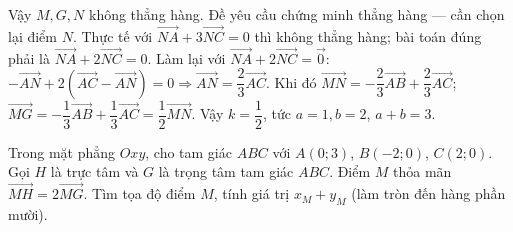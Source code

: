\begin{bt}
{Vậy $M,G,N$ không thẳng hàng. Đề yêu cầu chứng minh thẳng hàng — cần chọn lại điểm $N$. Thực tế với $\overrightarrow{NA}+3\overrightarrow{NC}=0$ thì không thẳng hàng; bài toán đúng phải là $\overrightarrow{NA}+2\overrightarrow{NC}=0$.
Làm lại với $\overrightarrow{NA}+2\overrightarrow{NC}=\overrightarrow{0}$: $-\overrightarrow{AN}+2(\overrightarrow{AC}-\overrightarrow{AN})=0\Rightarrow\overrightarrow{AN}=\dfrac23\overrightarrow{AC}$.
Khi đó $\overrightarrow{MN}=-\dfrac23\overrightarrow{AB}+\dfrac23\overrightarrow{AC}$; $\overrightarrow{MG}=-\dfrac13\overrightarrow{AB}+\dfrac13\overrightarrow{AC}=\dfrac12\overrightarrow{MN}$. Vậy $k=\dfrac12$, tức $a=1,b=2$, $a+b=3$.
}

\end{bt}

\begin{bt}%
Trong mặt phẳng $Oxy$, cho tam giác $ABC$ với $A(0;3)$, $B(-2;0)$, $C(2;0)$. Gọi $H$ là trực tâm và $G$ là trọng tâm tam giác $ABC$. Điểm $M$ thỏa mãn $\overrightarrow{MH}=2\overrightarrow{MG}$. Tìm tọa độ điểm $M$, tính giá trị $x_M+y_M$ (làm tròn đến hàng phần mười).

\end{bt}

